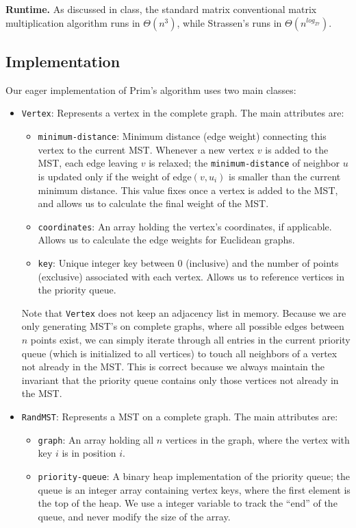 \documentclass[a4paper]{article}
\begin{document}
\textbf{Runtime.} As discussed in class, the standard matrix conventional matrix multiplication algorithm runs in $\Theta(n^3)$, while Strassen's runs in $\Theta(n^{log_27})$.



\subsection{Implementation}
Our eager implementation of Prim's algorithm uses two main classes:

\begin{itemize}
	\item \texttt{Vertex}: Represents a vertex in the complete graph. The main attributes are:
	\begin{itemize}
		\item \texttt{minimum-distance}: Minimum distance (edge weight) connecting this vertex to the current MST. Whenever a new vertex $v$ is added to the MST, each edge leaving $v$ is relaxed; the \texttt{minimum-distance} of neighbor $u$ is updated only if the weight of edge$(v, u_i)$ is smaller than the current minimum distance. This value fixes once a vertex is added to the MST, and allows us to calculate the final weight of the MST.
		\item \texttt{coordinates}: An array holding the vertex's coordinates, if applicable. Allows us to calculate the edge weights for Euclidean graphs.
		\item \texttt{key}: Unique integer key between 0 (inclusive) and the number of points (exclusive) associated with each vertex. Allows us to reference vertices in the priority queue.
	\end{itemize}
	Note that \texttt{Vertex} does not keep an adjacency list in memory. Because we are only generating MST's on complete graphs, where all possible edges between $n$ points exist, we can simply iterate through all entries in the current priority queue (which is initialized to all vertices) to touch all neighbors of a vertex not already in the MST. This is correct because we always maintain the invariant that the priority queue contains only those vertices not already in the MST.
	
	\item \texttt{RandMST}: Represents a MST on a complete graph. The main attributes are: 
	\begin{itemize}
		\item \texttt{graph}: An array holding all $n$ vertices in the graph, where the vertex with key $i$ is in position $i$.
		\item \texttt{priority-queue}: A binary heap implementation of the priority queue; the queue is an integer array containing vertex keys, where the first element is the top of the heap. We use a integer variable to track the ``end'' of the queue, and never modify the size of the array.
	\end{itemize}
\end{itemize}
\end{document}
